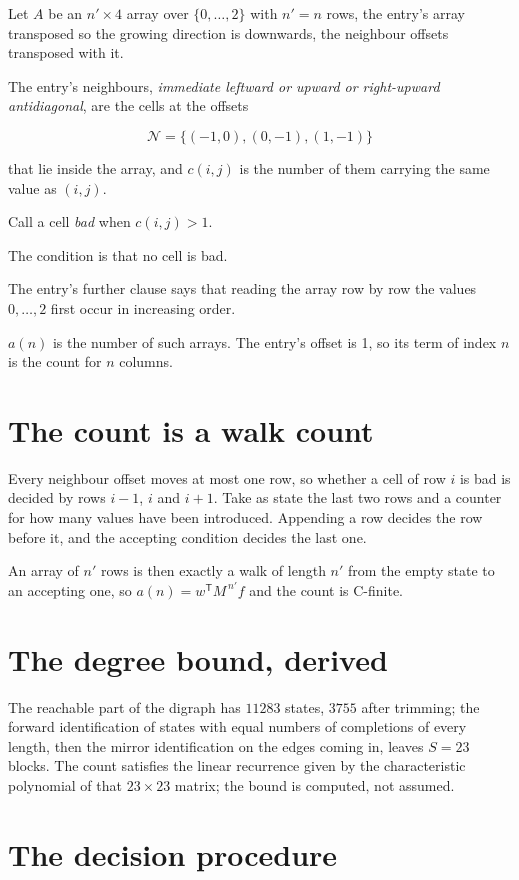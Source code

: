 \documentclass[11pt]{article}
\theoremstyle{definition}
\begin{document}
Let $A$ be an $n' \times 4$ array over $\{0,\dots,2\}$ with $n' = n$ rows, the entry's array transposed so the growing direction is downwards, the neighbour offsets transposed with it.

The entry's neighbours, {\itshape immediate leftward or upward or right-upward antidiagonal}, are the cells at the offsets

\[\mathcal{N} = \{(-1,0), (0,-1), (1,-1)\}\]

that lie inside the array, and $c(i,j)$ is the number of them carrying the same value as $(i,j)$.

Call a cell {\itshape bad} when $c(i,j) > 1$.

The condition is that no cell is bad.

The entry's further clause says that reading the array row by row the values $0,\dots,2$ first occur in increasing order.

$a(n)$ is the number of such arrays. The entry's offset is 1, so its term of index $n$ is the count for $n$ columns.

\section{The count is a walk count}

Every neighbour offset moves at most one row, so whether a cell of row $i$ is bad is decided by rows $i-1$, $i$ and $i+1$. Take as state the last two rows and a counter for how many values have been introduced. Appending a row decides the row before it, and the accepting condition decides the last one.

An array of $n'$ rows is then exactly a walk of length $n'$ from the empty state to an accepting one, so $a(n) = w^{\mathsf T}M^{\,n'}f$ and the count is C-finite.

\section{The degree bound, derived}

The reachable part of the digraph has $11283$ states, $3755$ after trimming; the forward identification of states with equal numbers of completions of every length, then the mirror identification on the edges coming in, leaves $S = 23$ blocks. The count satisfies the linear recurrence given by the characteristic polynomial of that $23\times23$ matrix; the bound is computed, not assumed.

\section{The decision procedure}
\end{document}
